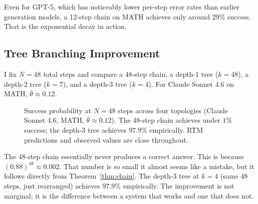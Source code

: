 \documentclass[11pt]{article}
\theoremstyle{plain}
\theoremstyle{definition}
\newcommand{\Prob}{\mathbb{P}}
\newcommand{\correct}{\textsc{correct}}
\begin{document}
Even for GPT-5, which has noticeably lower per-step error rates than earlier
generation models, a 12-step chain on MATH achieves only around $29\%$ success.
That is the exponential decay in action.

\subsection{Tree Branching Improvement}

I fix $N = 48$ total steps and compare a 48-step chain, a depth-1 tree
($k=48$), a depth-2 tree ($k=7$), and a depth-3 tree ($k=4$). For Claude
Sonnet 4.6 on MATH, $\bar\theta \approx 0.12$.

\begin{figure}[ht]
\centering
{}
\caption{Success probability at $N = 48$ steps across four topologies
(Claude Sonnet 4.6, MATH, $\bar\theta \approx 0.12$). The 48-step chain
achieves under $1\%$ success; the depth-3 tree achieves $97.9\%$ empirically.
RTM predictions and observed values are close throughout.}
\label{fig:tree-comparison}
\end{figure}

The 48-step chain essentially never produces a correct answer. This is because
$(0.88)^{48} \approx 0.002$. That number is so small it almost seems like a
mistake, but it follows directly from Theorem~\ref{thm:chain}. The depth-3 tree
at $k=4$ (same 48 steps, just rearranged) achieves $97.9\%$ empirically. The
improvement is not marginal; it is the difference between a system that works
and one that does not.
\end{document}
